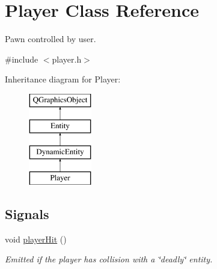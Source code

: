 \hypertarget{class_player}{}\section{Player Class Reference}
\label{class_player}


Pawn controlled by user.  




{\ttfamily \#include $<$player.\+h$>$}

Inheritance diagram for Player\+:\begin{figure}[H]
\begin{center}
\leavevmode
\includegraphics[height=4.000000cm]{class_player}
\end{center}
\end{figure}
\subsection*{Signals}
\begin{DoxyCompactItemize}
\item 
\mbox{\label{class_player_ae6adfe5de2cfa622d16e4e9358ea51ef}} 
void \hyperlink{class_player_ae6adfe5de2cfa622d16e4e9358ea51ef}{player\+Hit} ()
\begin{DoxyCompactList}\small\item\em Emitted if the player has collision with a \char`\"{}deadly\char`\"{} entity. \end{DoxyCompactList}\end{DoxyCompactItemize}
